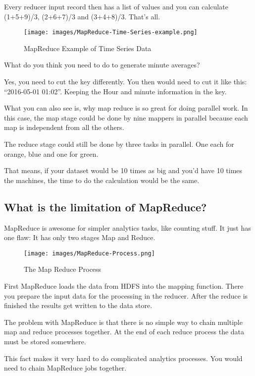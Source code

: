 \documentclass[12pt, numbers=noenddot]{scrreprt} %
\begin{document}
Every reducer input record then has a list of values and you can calculate (1+5+9)/3, (2+6+7)/3 and (3+4+8)/3. That’s all.

\begin{figure}[htbp]
  \centering
     \texttt{[image: images/MapReduce-Time-Series-example.png]}
  \caption{MapReduce Example of Time Series Data}
  \label{fig:Bild1}
\end{figure}

What do you think you need to do to generate minute averages?

Yes, you need to cut the key differently. You then would need to cut it like this: “2016-05-01 01:02”. Keeping the Hour and minute information in the key.

What you can also see is, why map reduce is so great for doing parallel work. In this case, the map stage could be done by nine mappers in parallel because each map is independent from all the others.

The reduce stage could still be done by three tasks in parallel. One each for orange, blue and one for green.

That means, if your dataset would be 10 times as big and you’d have 10 times the machines, the time to do the calculation would be the same.

\subsection{What is the limitation of MapReduce?}
MapReduce is awesome for simpler analytics tasks, like counting stuff. It just has one flaw: It has only two stages Map and Reduce.

\begin{figure}[htbp]
  \centering
     \texttt{[image: images/MapReduce-Process.png]}
  \caption{The Map Reduce Process}
  \label{fig:Bild1}
\end{figure}

First MapReduce loads the data from HDFS into the mapping function. There you prepare the input data for the processing in the reducer. After the reduce is finished the results get written to the data store.

The problem with MapReduce is that there is no simple way to chain multiple map and reduce processes together. At the end of each reduce process the data must be stored somewhere.

This fact makes it very hard to do complicated analytics processes. You would need to chain MapReduce jobs together.
\end{document}
